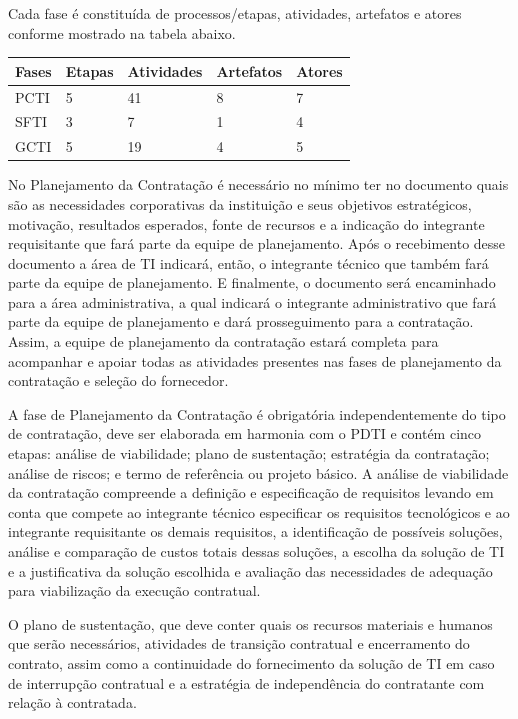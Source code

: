 Cada fase é constituída de processos/etapas, atividades, artefatos e atores conforme mostrado na tabela abaixo.
  
\begin{table}[htb]
\center
\footnotesize
\begin{tabular}{|p{1.4cm}|p{1cm}|p{3cm}|p{3cm}|p{3cm}|}
  \hline
   \textbf{Fases} & \textbf{Etapas}  & \textbf{Atividades}  & \textbf{Artefatos} & \textbf{Atores}  \\
    \hline
    PCTI & 5 & 41 & 8 & 7\\
   \hline    
    SFTI & 3 & 7 & 1 & 4\\
    \hline
    GCTI & 5 & 19 & 4 & 5\\
   \hline
\end{tabular}
\end{table}


No Planejamento da Contratação é necessário no mínimo ter no documento quais são as necessidades corporativas da instituição e seus objetivos estratégicos, motivação, resultados esperados, fonte de recursos e a indicação do integrante requisitante que fará parte da equipe de planejamento.  Após o recebimento desse documento a área de TI indicará, então, o integrante técnico que também fará parte da equipe de planejamento. E finalmente, o documento será encaminhado para a área administrativa, a qual indicará o integrante administrativo que fará parte da equipe de planejamento e dará prosseguimento para a contratação. Assim, a equipe de planejamento da contratação estará completa para acompanhar e apoiar todas as atividades presentes nas fases de planejamento da contratação e seleção do fornecedor.

A fase de Planejamento da Contratação é obrigatória independentemente do tipo de contratação, deve ser elaborada em harmonia com o PDTI e contém cinco etapas: análise de viabilidade; plano de sustentação; estratégia da contratação; análise de riscos; e termo de referência ou projeto básico. A análise de viabilidade da contratação compreende a definição e especificação de requisitos levando em conta que compete ao integrante técnico especificar os requisitos tecnológicos e ao integrante requisitante os demais requisitos, a identificação de possíveis soluções, análise e comparação de custos totais dessas soluções, a escolha da solução de TI e a justificativa da solução escolhida e avaliação das necessidades de adequação para viabilização da execução contratual. 

O plano de sustentação, que deve conter quais os recursos materiais e humanos que serão necessários, atividades de transição contratual e encerramento do contrato, assim como a continuidade do fornecimento da solução de TI em caso de interrupção contratual e a estratégia de independência do contratante com relação à contratada. 

